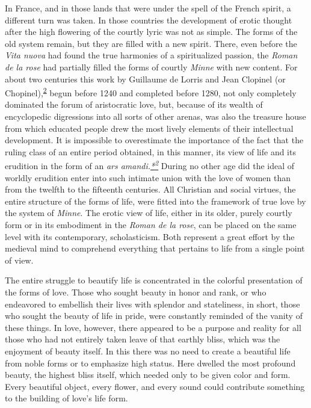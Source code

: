 In France, and in those lands that were under the spell of the French
spirit, a different turn was taken. In those countries the development
of erotic thought after the high flowering of the courtly lyric was not
as simple. The forms of the old system remain, but they are filled with
a new spirit. There, even before the \emph{Vita nuova} had found the
true harmonies of a spiritualized passion, the \emph{Roman de la rose}
had partially filled the forms of courtly \emph{Minne} with new content.
For about two centuries this work by Guillaume de Lorris and Jean
Clopinel (or
Chopinel),\textsuperscript{\protect\hypertarget{11_Chapter_Four__THE_FORMS_OF_LOVE.xhtmlux5cux23id_1484}{\protect\hyperlink{23_NOTES.xhtmlux5cux23id_1485}{2}}}
begun before 1240 and completed before 1280, not only completely
dominated the forum of aristocratic love, but, because of its wealth of
encyclopedic digressions into all sorts of other arenas, was also the
treasure house from which educated people drew the most lively elements
of their intellectual development. It is impossible to overestimate the
importance of the fact that the ruling class of an entire period
obtained, in this manner, its view of life and its erudition in the form
of an \emph{ars
amandi.\protect\hypertarget{11_Chapter_Four__THE_FORMS_OF_LOVE.xhtmlux5cux23id_3103}{\protect\hyperlink{23_NOTES.xhtmlux5cux23id_3104}{*\textsuperscript{2}}}}
During no other age did the ideal of worldly erudition enter into such
intimate union with the love of women than from the twelfth to the
fifteenth centuries. All Christian and social virtues, the entire
structure of the forms of life, were fitted into the framework of true
love by the system of \emph{Minne}. The erotic view of life, either in
its older, purely courtly form or in its embodiment in the \emph{Roman
de la rose}, can be placed on the same level with its contemporary,
scholasticism. Both represent a great effort by the medieval mind to
comprehend everything that pertains to life from a single point of view.

The entire struggle to beautify life is concentrated in the colorful
presentation of the forms of love. Those who sought beauty in honor and
rank, or who endeavored to embellish their lives with splendor and
stateliness, in short, those who sought the beauty of life in pride,
were constantly reminded of the vanity of these things. In love,
however, there appeared to be a purpose and reality for
\protect\hypertarget{11_Chapter_Four__THE_FORMS_OF_LOVE.xhtmlux5cux23page_128}{}{}all
those who had not entirely taken leave of that earthly bliss, which was
the enjoyment of beauty itself. In this there was no need to create a
beautiful life from noble forms or to emphasize high status. Here
dwelled the most profound beauty, the highest bliss itself, which needed
only to be given color and form. Every beautiful object, every flower,
and every sound could contribute something to the building of love's
life form.

